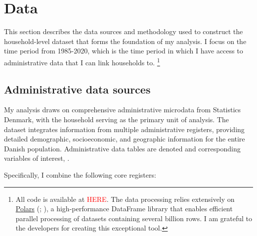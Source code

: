 \documentclass[main.tex]{subfiles}
\begin{document}
\section{Data}
\label{sec:data}

This section describes the data sources and methodology used to construct the household-level dataset that forms the foundation of my analysis. I focus on the time period from 1985-2020, which is the time period in which I have access to administrative data that I can link households to. \footnote{All code is available at \textcolor{red}{HERE}. The data processing relies extensively on \href{https://github.com/pola-rs/polars}{Polars} (\textcite{polars_ritchie_vink_2025}; \textcite{polars_grouper_van_eechoud}), a high-performance DataFrame library that enables efficient parallel processing of datasets containing several billion rows. I am grateful to the developers for creating this exceptional tool.} 

\subsection{Administrative data sources}

My analysis draws on comprehensive administrative microdata from Statistics Denmark, with the household serving as the primary unit of analysis. The dataset integrates information from multiple administrative registers, providing detailed demographic, socioeconomic, and geographic information for the entire Danish population. Administrative data tables are denoted  and corresponding variables of interest, .

Specifically, I combine the following core registers:
\end{document}
